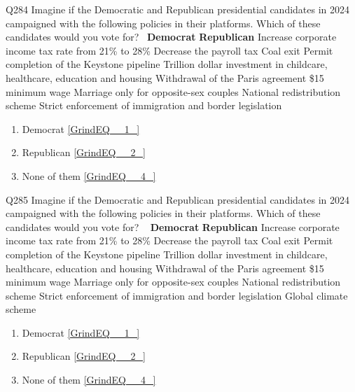 \documentclass{article} %
\begin{document}
\noindent 

\noindent Q284 Imagine if the Democratic and Republican presidential candidates in 2024 campaigned with the following policies in their platforms.  Which of these candidates would you vote for?~          \textbf{Democrat}    \textbf{Republican}          Increase corporate income tax rate from 21\% to 28\%    Decrease the payroll tax          Coal exit    Permit completion of the Keystone pipeline          Trillion dollar investment in childcare, healthcare, education and housing    Withdrawal of the Paris agreement          \$15 minimum wage    Marriage only for opposite-sex couples          National redistribution scheme    Strict enforcement of immigration and border legislation       

\begin{enumerate}
\item  Democrat  \eqref{GrindEQ__1_} 

\item  Republican  \eqref{GrindEQ__2_} 

\item  None of them  \eqref{GrindEQ__4_} 
\end{enumerate}

\noindent 

\noindent 

\noindent 

\noindent Q285 Imagine if the Democratic and Republican presidential candidates in 2024 campaigned with the following policies in their platforms.  Which of these candidates would you vote for? ~          \textbf{Democrat}    \textbf{Republican}          Increase corporate income tax rate from 21\% to 28\%    Decrease the payroll tax          Coal exit    Permit completion of the Keystone pipeline          Trillion dollar investment in childcare, healthcare, education and housing    Withdrawal of the Paris agreement          \$15 minimum wage    Marriage only for opposite-sex couples          National redistribution scheme    Strict enforcement of immigration and border legislation          Global climate scheme    ~       

\begin{enumerate}
\item  Democrat  \eqref{GrindEQ__1_} 

\item  Republican  \eqref{GrindEQ__2_} 

\item  None of them  \eqref{GrindEQ__4_} 
\end{enumerate}
\end{document}
